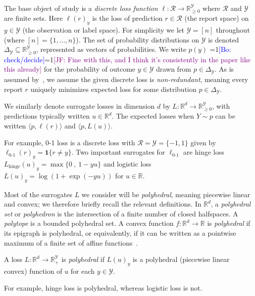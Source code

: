 \documentclass[anon]{colt2020} %
\newcommand{\Comments}{1}
\newcommand{\mynote}[2]{\ifnum\Comments=1\textcolor{#1}{#2}\fi}
\newcommand{\jessie}[1]{\mynote{purple}{[JF: #1]}}
\newcommand{\bo}[1]{\mynote{blue}{[Bo: #1]}}
\newcommand{\reals}{\mathbb{R}}
\newcommand{\nonnegreals}{\reals_{\geq 0}}%
\newcommand{\simplex}{\Delta_\Y}
\newcommand{\R}{\mathcal{R}}
\newcommand{\Y}{\mathcal{Y}}
\newcommand{\hinge}{L_{\mathrm{hinge}}}
\newcommand{\ellzo}{\ell_{\text{0-1}}}
\newcommand{\risk}[1]{\underline{#1}}
\newcommand{\inprod}[2]{\langle #1, #2 \rangle}%
\newcommand{\Ind}[1]{\mathbf{1}\{#1\}}
\begin{document}
The base object of study is a \emph{discrete loss function} $\ell: \R \to \nonnegreals^{\Y}$ where $\R$ and $\Y$ are finite sets.
Here $\ell(r)_y$ is the loss of prediction $r \in \R$ (the report space) on $y \in \Y$ (the observation or label space).
For simplicity we let $\Y = [n]$ throughout (where $[n] = \{1,\ldots,n\}$).
The set of probability distributions on $\Y$ is denoted $\simplex\subseteq\nonnegreals^{\Y}$, represented as vectors of probabilities.
We write $p(y)$ \bo{check/decide}\jessie{Fine with this, and I think it's consistently in the paper like this already} for the probability of outcome $y \in \Y$ drawn from $p \in \simplex$.
As is assumed by~\cite{finocchiaro2019embedding}, we assume the given discrete loss is \emph{non-redundant}, meaning every report $r$ uniquely minimizes expected loss for some distribution $p\in\simplex$.

We similarly denote surrogate losses in dimension $d$ by $L:\reals^d\to\nonnegreals^{\Y}$, with predictions typically written $u\in\reals^d$.
The expected losses when $Y \sim p$ can be written $\inprod{p}{\ell(r)}$ and $\inprod{p}{L(u)}$.

For example, 0-1 loss is a discrete loss with $\R = \Y = \{-1,1\}$
given by $\ellzo(r)_y = \Ind{r \neq y}$.%
Two important surrogates for $\ellzo$ are hinge loss $\hinge(u)_y = \max\{ 0 ~,~ 1-yu \}$ and logistic loss $L(u)_y = \log(1+\exp(-yu))$ for $u\in\reals$.

Most of the surrogates $L$ we consider will be \emph{polyhedral}, meaning piecewise linear and convex; we therefore briefly recall the relevant definitions.
In $\reals^d$, a \emph{polyhedral set} or \emph{polyhedron} is the intersection of a finite number of closed halfspaces.
A \emph{polytope} is a bounded polyhedral set.
A convex function $f:\reals^d\to\reals$ is \emph{polyhedral} if its epigraph is polyhedral, or equivalently, if it can be written as a pointwise maximum of a finite set of affine functions~\citep{rockafellar1997convex}.
%
\begin{definition}
	A loss $L: \reals^d \to \reals^{\Y}_+$ is \emph{polyhedral} if $L(u)_y$ is a polyhedral (piecewise linear convex) function of $u$ for each $y\in\Y$.
\end{definition}
%
For example, hinge loss is polyhedral, whereas logistic loss is not.
\end{document}
